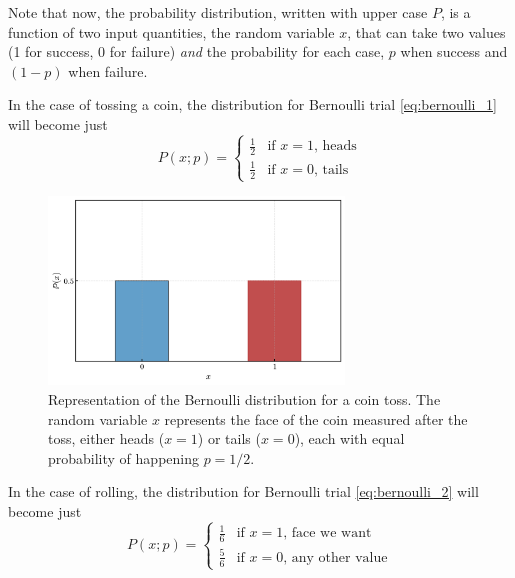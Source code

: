 \documentclass{book}
\begin{document}
Note that now, the probability distribution, written with upper case $P$, is a function of two input quantities, the random variable $x$, that can take two values (1 for success, 0 for failure) \textit{and} the probability for each case, $p$ when success and $(1 - p)$ when failure.

In the case of tossing a coin, the distribution for Bernoulli trial  \eqref{eq:bernoulli_1} will become just 
\begin{equation}
	P(x; p) = 
		\begin{cases}
			\frac{1}{2} & \text{if $x = 1$, heads} \\
			\frac{1}{2}& \text{if $x = 0$, tails}
		\end{cases}
\end{equation}

\begin{figure}[ht]
    \centering
    \includegraphics[width=0.7\textwidth]{figures/chapter2/bernoulli_1.png}
    \caption{Representation of the Bernoulli distribution for a coin toss. The random variable $x$ represents the face of the coin measured after the toss, either heads ($x = 1$) or tails ($x = 0$), each with equal probability of happening $p = 1/2$.}
    \label{fig:bernoulli_1}
\end{figure}

In the case of rolling, the distribution for Bernoulli trial  \eqref{eq:bernoulli_2} will become just 
\begin{equation}
	P(x; p) = 
		\begin{cases}
			\frac{1}{6} & \text{if $x = 1$, face we want} \\
			\frac{5}{6}& \text{if $x = 0$, any other value}
		\end{cases}
\end{equation}
\end{document}
